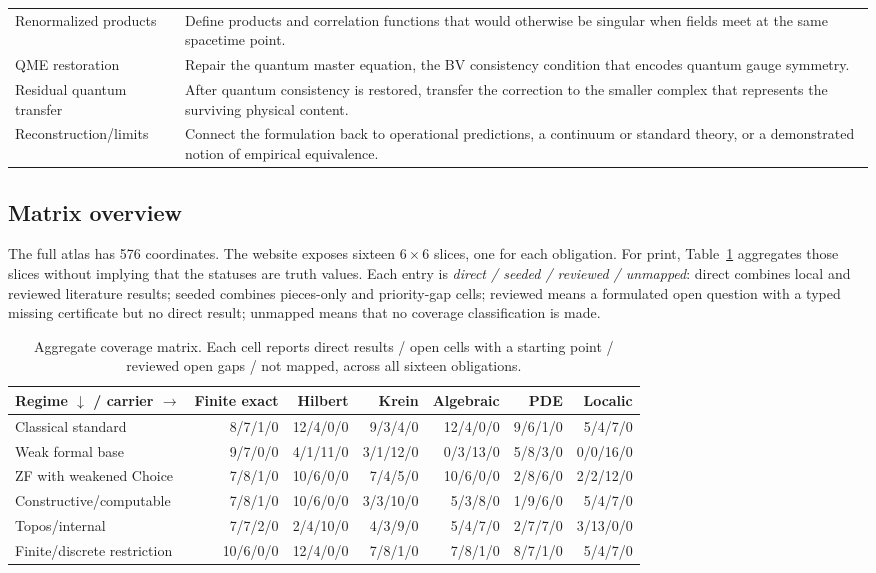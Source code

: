 \begin{longtable}{@{}p{}p{}@{}}
Renormalized products & Define products and correlation functions that would otherwise be singular when fields meet at the same spacetime point. \\
QME restoration & Repair the quantum master equation, the BV consistency condition that encodes quantum gauge symmetry. \\
Residual quantum transfer & After quantum consistency is restored, transfer the correction to the smaller complex that represents the surviving physical content. \\
Reconstruction/limits & Connect the formulation back to operational predictions, a continuum or standard theory, or a demonstrated notion of empirical equivalence. \\
\bottomrule
\end{longtable}
\endgroup

\subsection{Matrix overview}
\label{app:matrix-overview}
The full atlas has 576 coordinates.  The website exposes sixteen \(6\times6\) slices, one for each obligation.  For print, Table~\ref{tab:aggregate-matrix} aggregates those slices without implying that the statuses are truth values.  Each entry is \emph{direct / seeded / reviewed / unmapped}: direct combines local and reviewed literature results; seeded combines pieces-only and priority-gap cells; reviewed means a formulated open question with a typed missing certificate but no direct result; unmapped means that no coverage classification is made.

\begin{table}[htbp]
\centering
\scriptsize
\setlength{\tabcolsep}{2pt}
\begin{tabular}{@{}p{}rrrrrr@{}}
\toprule
Regime \(\downarrow\) / carrier \(\rightarrow\) & Finite exact & Hilbert & Krein & Algebraic & PDE & Localic \\
\midrule
Classical standard & 8/7/1/0 & 12/4/0/0 & 9/3/4/0 & 12/4/0/0 & 9/6/1/0 & 5/4/7/0 \\
Weak formal base & 9/7/0/0 & 4/1/11/0 & 3/1/12/0 & 0/3/13/0 & 5/8/3/0 & 0/0/16/0 \\
ZF with weakened Choice & 7/8/1/0 & 10/6/0/0 & 7/4/5/0 & 10/6/0/0 & 2/8/6/0 & 2/2/12/0 \\
Constructive/computable & 7/8/1/0 & 10/6/0/0 & 3/3/10/0 & 5/3/8/0 & 1/9/6/0 & 5/4/7/0 \\
Topos/internal & 7/7/2/0 & 2/4/10/0 & 4/3/9/0 & 5/4/7/0 & 2/7/7/0 & 3/13/0/0 \\
Finite/discrete restriction & 10/6/0/0 & 12/4/0/0 & 7/8/1/0 & 7/8/1/0 & 8/7/1/0 & 5/4/7/0 \\
\bottomrule
\end{tabular}
\caption{Aggregate coverage matrix.  Each cell reports direct results / open cells with a starting point / reviewed open gaps / not mapped, across all sixteen obligations.}
\label{tab:aggregate-matrix}
\end{table}

